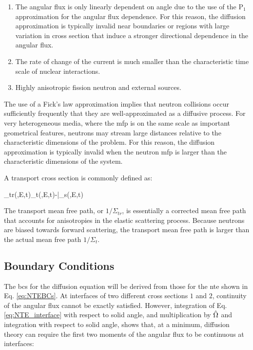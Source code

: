 \begin{enumerate}
\item The angular flux is only linearly dependent on angle due to the use of the P$_{1}$ approximation for the angular flux dependence. For this reason, the diffusion approximation is typically invalid near boundaries or regions with large variation in cross section that induce a stronger directional dependence in the angular flux.
\item The rate of change of the current is much smaller than the characteristic time scale of nuclear interactions.
\item Highly anisotropic fission neutron and external sources.
\end{enumerate}

The use of a Fick's law approximation implies that neutron collisions occur sufficiently frequently that they are well-approximated as a diffusive process. For very heterogeneous media, where the \gls{mfp} is on the same scale as important geometrical features, neutrons may stream large distances relative to the characteristic dimensions of the problem. For this reason, the diffusion approximation is typically invalid when the neutron \gls{mfp} is larger than the characteristic dimensions of the system.

A transport cross section is commonly defined as:

\beq
\label{eq:TransportSigma}
\Sigma_{tr}(,E,t)\equiv\Sigma_t(,E,t)-\bar{\mu}\Sigma_s(,E,t)
\eeq

The transport mean free path, or \(1/\Sigma_{tr}\), is essentially a corrected mean free path that accounts for anisotropies in the elastic scattering process. Because neutrons are biased towards forward scattering, the transport mean free path is larger than the actual mean free path \(1/\Sigma_t\). 

\subsection{Boundary Conditions}

The \glspl{bc} for the diffusion equation will be derived from those for the \gls{nte} shown in Eq. \eqref{eq:NTEBCs}. At interfaces of two different cross sections \(1\) and \(2\), continuity of the angular flux cannot be exactly satisfied. However, integration of Eq. \eqref{eq:NTE_interface} with respect to solid angle, and multiplication by \(\hat{\Omega}\) and integration with respect to solid angle, shows that, at a minimum, diffusion theory can require the first two moments of the angular flux to be continuous at interfaces:

